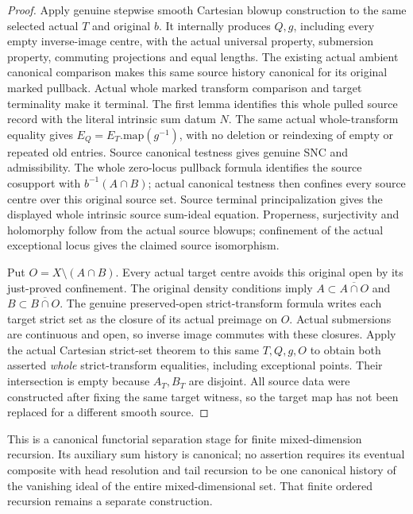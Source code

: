 \begin{proof}
Apply genuine stepwise smooth Cartesian blowup construction to the same
selected actual $T$ and original $b$. It internally produces $Q,g$,
including every empty inverse-image centre, with the actual universal
property, submersion property, commuting projections and equal lengths.
The existing actual ambient canonical comparison makes this same source
history canonical for its original marked pullback. Actual whole marked
transform comparison and target terminality make it terminal. The first
lemma identifies this whole pulled source record with the literal
intrinsic sum datum $N$. The same actual whole-transform equality gives
$E_Q=E_T.\mathrm{map}(g^{-1})$, with no deletion or reindexing of empty
or repeated old entries. Source canonical testness gives genuine SNC and
admissibility. The whole zero-locus pullback formula identifies the
source cosupport with $b^{-1}(A\cap B)$; actual canonical testness then
confines every source centre over this original source set.
Source terminal principalization gives the displayed
whole intrinsic source sum-ideal equation. Properness, surjectivity and
holomorphy follow from the actual source blowups; confinement of the
actual exceptional locus gives the claimed source isomorphism.

Put $O=X\setminus(A\cap B)$. Every actual target centre avoids this
original open by its just-proved confinement. The original density
conditions imply $A\subset\overline{A\cap O}$ and
$B\subset\overline{B\cap O}$. The genuine preserved-open strict-transform
formula writes each target strict set as the closure of its actual
preimage on $O$. Actual submersions are continuous and open, so inverse
image commutes with these closures. Apply the actual Cartesian strict-set
theorem to this same $T,Q,g,O$ to obtain both asserted \emph{whole}
strict-transform equalities, including exceptional points. Their
intersection is empty because $A_T,B_T$ are disjoint. All source data
were constructed after fixing the same target witness, so the target
map has not been replaced for a different smooth source.
\end{proof}

This is a canonical functorial separation stage for finite mixed-dimension
recursion. Its auxiliary sum history is canonical; no assertion requires
its eventual composite with head resolution and tail recursion to be one
canonical history of the vanishing ideal of the entire mixed-dimensional
set. That finite ordered recursion remains a separate construction.
